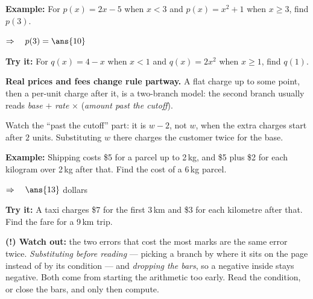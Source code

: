 \documentclass[12pt]{article}
\begin{document}
\begin{examplebox}
\textbf{Example:} \quad For $p(x) = 2x - 5$ when $x < 3$ and $p(x) = x^2 + 1$ when
$x \geq 3$, find $p(3)$.

$\Rightarrow\quad p(3) = \ans{10}$
\end{examplebox}

\begin{tryitbox}
\textbf{Try it:} \quad For $q(x) = 4 - x$ when $x < 1$ and $q(x) = 2x^2$ when
$x \geq 1$, find $q(1)$.\\[2pt]
\end{tryitbox}


\begin{formulabox}
\textbf{Real prices and fees change rule partway.} A flat charge up to some point, then a
per-unit charge after it, is a two-branch model: the second branch usually reads
\emph{base} $+$ \emph{rate} $\times$ (\emph{amount past the cutoff}).\par
\smallskip
Watch the ``past the cutoff'' part: it is $w - 2$, not $w$, when the extra charges start
after $2$ units. Substituting $w$ there charges the customer twice for the base.
\end{formulabox}

\begin{examplebox}
\textbf{Example:} \quad Shipping costs \$5 for a parcel up to 2\,kg, and \$5 plus \$2 for
each kilogram over 2\,kg after that. Find the cost of a 6\,kg parcel.

$\Rightarrow\quad \ans{13}$ dollars
\end{examplebox}

\begin{tryitbox}
\textbf{Try it:} \quad A taxi charges \$7 for the first 3\,km and \$3 for each kilometre
after that. Find the fare for a 9\,km trip.\\[2pt]
\end{tryitbox}

\begin{watchoutbox}
\textbf{(!) Watch out:} the two errors that cost the most marks are the same error twice.
\emph{Substituting before reading} --- picking a branch by where it sits on the page
instead of by its condition --- and \emph{dropping the bars}, so a negative inside stays
negative. Both come from starting the arithmetic too early. Read the condition, or close
the bars, and only then compute.
\end{watchoutbox}
\end{document}

